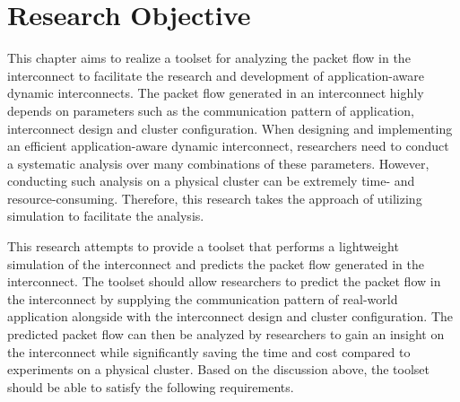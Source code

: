 \section{Research Objective}\label{sec:ii-objective}

This chapter aims to realize a toolset for analyzing the packet flow in the
interconnect to facilitate the research and development of application-aware
dynamic interconnects. The packet flow generated in an interconnect highly
depends on parameters such as the communication pattern of application,
interconnect design and cluster configuration. When designing and implementing
an efficient application-aware dynamic interconnect, researchers need to
conduct a systematic analysis over many combinations of these parameters.
However, conducting such analysis on a physical cluster can be extremely time-
and resource-consuming. Therefore, this research takes the approach of
utilizing simulation to facilitate the analysis.

This research attempts to provide a toolset that performs a lightweight
simulation of the interconnect and predicts the packet flow generated in the
interconnect. The toolset should allow researchers to predict the packet flow
in the interconnect by supplying the communication pattern of real-world
application alongside with the interconnect design and cluster configuration.
The predicted packet flow can then be analyzed by researchers to gain an
insight on the interconnect while significantly saving the time and cost
compared to experiments on a physical cluster. Based on the discussion above,
the toolset should be able to satisfy the following requirements.


